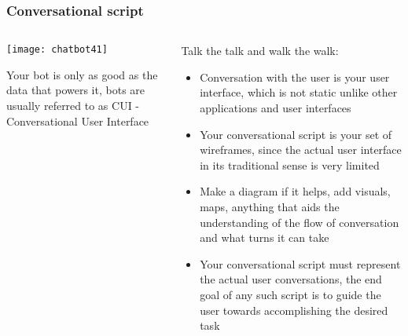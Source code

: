 \begin{frame}[fragile]\frametitle{Conversational script}
    \begin{columns}
    \begin{column}[t]{0.5\linewidth}
\begin{center}
\texttt{[image: chatbot41]}
\end{center}

Your bot is only as good as the data that powers it, bots are usually referred to as CUI - Conversational User Interface
\end{column}
    \begin{column}[t]{0.5\linewidth}
Talk the talk and walk the walk:

\begin{itemize}
\item Conversation with the user is your user interface, which is not static unlike other applications and user interfaces
\item Your conversational script is your set of wireframes, since the actual user interface in its traditional sense is very limited
\item Make a diagram if it helps, add visuals, maps, anything that aids the understanding of the flow of conversation and what turns it can take
\item Your conversational script must represent the actual user conversations, the end goal of any such script is to guide the user towards accomplishing the desired task
\end{itemize}
\end{column}
\end{columns}
\end{frame}


